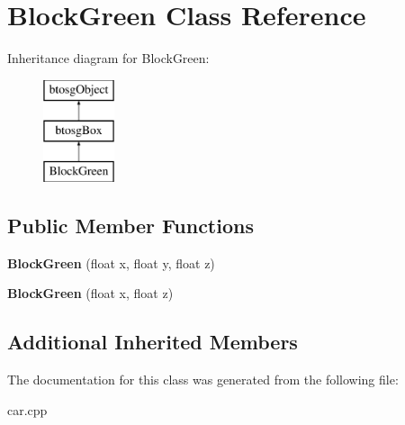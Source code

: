 \hypertarget{classBlockGreen}{}\section{Block\+Green Class Reference}
\label{classBlockGreen}
Inheritance diagram for Block\+Green\+:\begin{figure}[H]
\begin{center}
\leavevmode
\includegraphics[height=3.000000cm]{classBlockGreen}
\end{center}
\end{figure}
\subsection*{Public Member Functions}
\begin{DoxyCompactItemize}
\item 
\mbox{\label{classBlockGreen_aa1ce13416cb41b01defc2291a1627fd4}} 
{\bfseries Block\+Green} (float x, float y, float z)
\item 
\mbox{\label{classBlockGreen_a4e29c2c2494b8237fa4431f47ada23c9}} 
{\bfseries Block\+Green} (float x, float z)
\end{DoxyCompactItemize}
\subsection*{Additional Inherited Members}


The documentation for this class was generated from the following file\+:\begin{DoxyCompactItemize}
\item 
car.\+cpp\end{DoxyCompactItemize}
